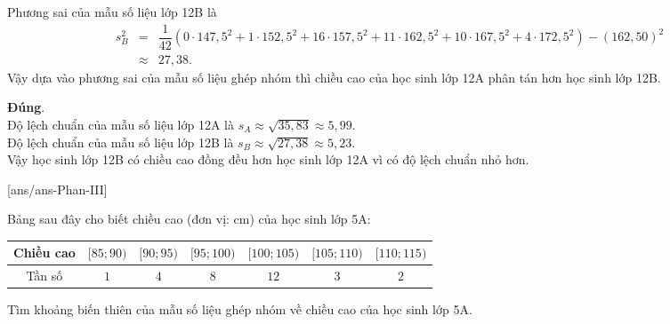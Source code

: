 \begin{ex}
{\begin{itemchoice}
 Phương sai của mẫu số liệu lớp 12B là
 \begin{eqnarray*}
 s_B^2&=&\dfrac{1}{42} \left(0\cdot 147{,}5^2+1\cdot 152{,}5^2+16\cdot 157{,}5^2+11\cdot 162{,}5^2+10\cdot 167{,}5^2+4\cdot 172{,}5^2\right)-\left(162{,}50\right)^2\\&\approx& 27{,}38.
 \end{eqnarray*}
 Vậy dựa vào phương sai của mẫu số liệu ghép nhóm thì chiều cao của học sinh lớp 12A phân tán hơn học sinh lớp 12B.
 
 \itemch \textbf{Đúng}. 
 \\Độ lệch chuẩn của mẫu số liệu lớp 12A là $s_A \approx \sqrt{35{,}83} \approx 5{,}99$.\\
 Độ lệch chuẩn của mẫu số liệu lớp 12B là $s_B \approx \sqrt{27{,}38} \approx 5{,}23$.\\
 Vậy học sinh lớp 12B có chiều cao đồng đều hơn học sinh lớp 12A vì có độ lệch chuẩn nhỏ hơn.
 \end{itemchoice}
 }
\end{ex}

\TNSA
{}[ans/ans\currfilebase-Phan-III]
\begin{ex}%
 Bảng sau đây cho biết chiều cao (đơn vị: cm) của học sinh lớp 5A:
 \begin{center}
 \begin{tabular}{|c|c|c|c|c|c|c|}
 \hline
 Chiều cao & $[85; 90)$ & $[90; 95)$ & $[95; 100)$ & $[100; 105)$ & $[105; 110)$& $[110; 115)$\\
 \hline Tần số & $1$ & $4$ & $8$ & $12$ & $3$ & $2$ \\ \hline
 \end{tabular}
 \end{center}
 Tìm khoảng biến thiên của mẫu số liệu ghép nhóm về chiều cao của học sinh lớp 5A.
 
\end{ex}

